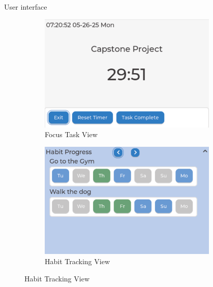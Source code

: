 \documentclass[final, cmyk]{beamer}
\newlength{\sepwidth}
\newlength{\colwidth}
\newlength{\bigcolwidth}
\newcommand{\separatorcolumn}{\begin{column}{\sepwidth}\end{column}}
\begin{document}
\begin{frame}[t]
\begin{columns}
\begin{column}{\bigcolwidth}
\begin{block}{User interface}
\begin{figure}
\begin{subfigure}{0.24\textwidth}
            \includegraphics[width=\textwidth]{focusTile_CMYK.pdf}
            \caption{Focus Task View}
          \end{subfigure}
          \hfill
          \begin{subfigure}{0.24\textwidth}
            \includegraphics[width=\textwidth]{habitTile_CMYK.pdf}
            \caption{Habit Tracking View}
          \end{subfigure}
        \end{figure} 
      \end{block}
    \end{column}
    \separatorcolumn
  \end{columns}

\end{frame}
\end{document}
